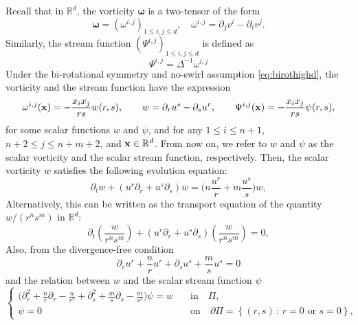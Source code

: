 \documentclass[11pt]{amsart}
\theoremstyle{definition}
\theoremstyle{remark}
\numberwithin{equation}{section}
\numberwithin{equation}{section}
\newcommand{\lap}{\Delta}
\newcommand{\rd}{\partial}
\newcommand{\0}{\emptyset}
\newcommand{\omg}{\omega}
\newcommand{\bfx}{{\bf x}}
\newcommand{\bbR}{\mathbb R}
\begin{document}
	Recall that in $\bbR^{d}$, the vorticity $ \boldsymbol{\omg} $ is a two-tensor of the form
	\begin{equation}\label{eq:vorttensor}
		\boldsymbol{\omg} = (\omg^{i,j})_{1\leq i,j\leq d},\quad \omg^{i,j}=\rd_{j}v^{i}-\rd_{i}v^{j}.
	\end{equation} 
	Similarly, the stream function $ (\Psi^{i,j})_{1\leq i,j\leq d} $ is defined as
	\begin{equation}\label{eq:streamftntensor}
		\Psi^{i,j}=\lap^{-1}\omg^{i,j}
	\end{equation}
	Under the bi-rotational symmetry and no-swirl assumption \eqref{eq:birothighd}, the vorticity and the stream function have the expression
	\begin{equation}\label{eq:vorttensca}
		\omg^{i,j}(\bfx)=-\frac{x_{i}x_{j}}{rs}w(r,s),\qquad w=\rd_{r}u^{s}-\rd_{s}u^{r}, \qquad \Psi^{i,j}(\bfx)=-\frac{x_{i}x_{j}}{rs}\psi(r,s),
	\end{equation}
	for some scalar functions $w$ and $\psi$, and for any $1\leq i\leq n+1$, $n+2\leq j\leq n+m+2$, and $ \bfx\in \bbR^{d} $. From now on, we refer to $w$ and $\psi$ as the scalar vorticity and the scalar stream function, respectively. Then, the scalar vorticity $w$ satisfies the following evolution equation:
	\begin{equation}\label{eq:vorteq}
		\rd_{t}w+(u^{r}\rd_{r}+u^{s}\rd_{s})w=\bigg(n\frac{u^{r}}{r}+m\frac{u^{s}}{s}\bigg)w,
	\end{equation}
	Alternatively, this can be written as the transport equation of the quantity $w/(r^{n}s^{m})$ in $\bbR^{d}$:
	\begin{equation}\label{eq:vorticityeq}
		\rd_{t}\left(\frac{w}{r^{n}s^{m}}\right)+(u^{r}\rd_{r}+u^{s}\rd_{s})\left(\frac{w}{r^{n}s^{m}}\right)=0,
	\end{equation}
	Also, from the divergence-free condition
	\begin{equation}\label{eq:divergencefree}
		\rd_{r}u^{r}+\frac{n}{r}u^{r}+\rd_{s}u^{s}+\frac{m}{s}u^{s}=0
	\end{equation}
	and the relation between $w$ and the scalar stream function $\psi$
	\begin{equation}\label{eq:psi-w-relation}
		\left\{
		\begin{aligned}
			\bigg(\rd_{r}^{2}+\frac{n}{r}\rd_{r}-\frac{n}{r^{2}}+\rd_{s}^{2}+\frac{m}{s}\rd_{s}-\frac{m}{s^{2}}\bigg) \psi = w \quad &\mbox{in} \quad \Pi , \\
			\psi = 0 \quad &\mbox{on} \quad \partial\Pi = \left\{ (r,s) \, : \, r = 0 \mbox{ or } s = 0 \right\}, 
		\end{aligned}
		\right.
	\end{equation}
\end{document}
